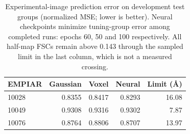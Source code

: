 \begin{table}[!t]
\centering
\caption{Experimental-image prediction error on development test groups (normalized MSE; lower is better). Neural checkpoints minimize tuning-group error among completed runs: epochs 60, 50 and 100 respectively. All half-map FSCs remain above 0.143 through the sampled limit in the last column, which is not a measured crossing.}
\label{tab:reconstruction}
\begin{tabular}{lrrrr}
\toprule
EMPIAR & Gaussian & Voxel & Neural & Limit (\AA) \\
\midrule
10028 & 0.8355 & 0.8417 & 0.8293 & 16.08 \\
10049 & 0.9308 & 0.9316 & 0.9302 & 7.87 \\
10076 & 0.8764 & 0.8806 & 0.8707 & 13.97 \\
\bottomrule
\end{tabular}
\end{table}
